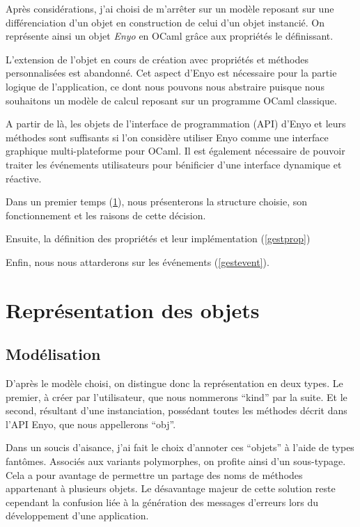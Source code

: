 \documentclass[11pt,a4paper]{report}
\begin{document}
Après considérations, j'ai choisi de m'arrêter sur un modèle reposant sur une différenciation
d'un objet en construction de celui d'un objet instancié. On représente ainsi un objet \emph{Enyo}
en OCaml grâce aux propriétés le définissant.\medskip

\medskip

L'extension de l'objet en cours de création avec propriétés et méthodes personnalisées est 
abandonné. Cet aspect d'Enyo est nécessaire pour la partie logique de l'application, ce dont 
nous pouvons nous abstraire puisque nous souhaitons un modèle de calcul reposant sur 
un programme OCaml classique.

A partir de là, les objets de l'interface de programmation (API) d'Enyo et leurs méthodes 
sont suffisants si l'on considère utiliser Enyo comme une interface graphique multi-plateforme
pour OCaml. Il est également nécessaire de pouvoir traiter les événements utilisateurs pour bénificier 
d'une interface dynamique et réactive.

Dans un premier temps (\ref{repobj}), nous présenterons la structure choisie, son fonctionnement et les raisons
de cette décision.

Ensuite, la définition des propriétés et leur implémentation (\ref{gestprop})

Enfin, nous nous attarderons sur les événements (\ref{gestevent}).

\section{Représentation des objets}\label{repobj}
\subsection{Modélisation}
D'après le modèle choisi, on distingue donc la représentation en deux types. Le premier,
à créer par l'utilisateur, que nous nommerons ``kind'' par la suite. Et le second,
résultant d'une instanciation, possédant toutes les méthodes décrit dans l'API Enyo, que
nous appellerons ``obj''.

Dans un soucis d'aisance, j'ai fait le choix d'annoter ces ``objets'' à l'aide de types fantômes.
Associés aux variants polymorphes, on profite ainsi d'un sous-typage.
Cela a pour avantage de permettre un partage des noms de méthodes appartenant à plusieurs objets. 
Le désavantage majeur de cette solution reste cependant la confusion liée 
à la génération des messages d'erreurs lors du développement d'une application.
\end{document}
